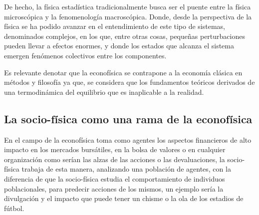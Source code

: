 De hecho, la física estadística tradicionalmente busca ser el puente entre la física microscópica y la fenomenología macroscópica. Donde, desde la perspectiva de la física se ha podido avanzar en el entendimiento de este tipo de sistemas, denominados complejos, en los que, entre otras cosas, pequeñas perturbaciones pueden llevar a efectos enormes, y donde los estados que alcanza el sistema emergen fenómenos colectivos entre los componentes. \cite{Rodriguez2021}

Es relevante denotar que la econofísica se contrapone a la economía clásica en métodos y filosofía ya que, se considera que los fundamentos teóricos derivados de una termodinámica del equilibrio que es inaplicable a la realidad.

\subsection*{La socio-física como una rama de la econofísica}
En el campo de la econofísica toma como agentes los aspectos financieros de alto impacto en los mercados bursátiles, en la bolsa de valores o en cualquier organización como serían las alzas de las acciones o las devaluaciones, la socio-física trabaja de esta manera, analizando una población de agentes, con la diferencia de que la socio-física estudia el comportamiento de individuos poblacionales, para predecir acciones de los mismos, un ejemplo sería la divulgación y el impacto que puede tener un chisme o la ola de los estadios de fútbol.\cite{Galam2008}
\thispagestyle{empty}	
